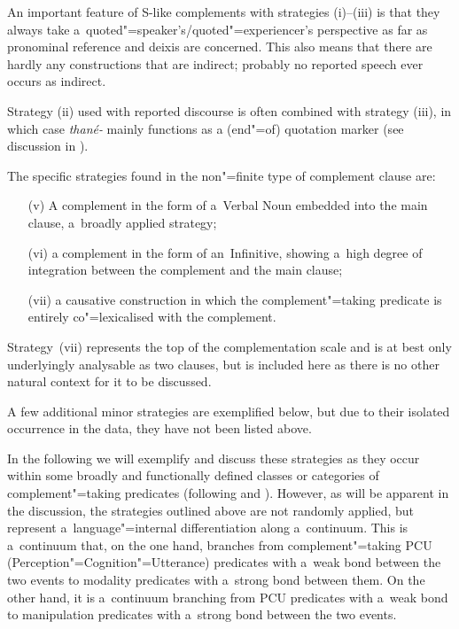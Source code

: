 An important feature of S-like complements with strategies (i)--(iii) is that they always take a~quoted"=speaker's/quoted"=experiencer's perspective as far as pronominal reference and deixis are concerned. This also means that there are hardly any constructions that are indirect; probably no reported speech ever occurs as indirect.


Strategy (ii) used with reported discourse is often combined with strategy (iii), in which case \textit{thané-} mainly functions as a (end"=of) quotation marker (see discussion in ).


The specific strategies found in the non"=finite type of complement clause are:

\begin{enumerate}
\item[(v)] A complement in the form of a~Verbal Noun embedded into the main clause, a~broadly applied strategy;
\item[(vi)] a complement in the form of an~Infinitive, showing a~high degree of integration between the complement and the main clause;
\item[(vii)] a causative construction in which the complement"=taking predicate is entirely co"=lexicalised with the complement.
\end{enumerate}
Strategy~(vii) represents the top of the complementation scale \citep[74]{givon2001b} and is at best only underlyingly analysable as two clauses, but is included here as there is no other natural context for it to be discussed.


A few additional minor strategies are exemplified below, but due to their isolated occurrence in the data, they have not been listed above.



In the following we will exemplify and discuss these strategies as they occur within some broadly and functionally defined classes or categories of complement"=taking predicates (following \citealt[40--59]{givon2001b} and \citealt[120--145]{noonan2007}). However, as will be apparent in the discussion, the strategies outlined above are not randomly applied, but represent a~language"=internal differentiation along a~continuum. This is a~continuum that, on the one hand, branches from complement"=taking PCU (Perception"=Cognition"=Utterance) predicates with a~weak bond between the two events to modality predicates with a~strong bond between them. On the other hand, it is a~continuum branching from PCU predicates with a~weak bond to manipulation predicates with a~strong bond between the two events.


